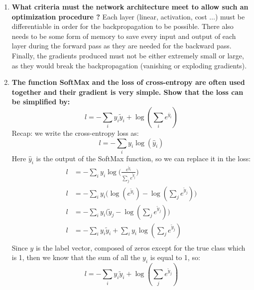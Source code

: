 \documentclass[12pt,a4paper]{article}
\begin{document}
\begin{enumerate}[resume]
    \item \textbf{What criteria must the network architecture meet to allow such an optimization procedure ?} \newline
    Each layer (linear, activation, cost $\dots$) must be differentiable in order for the backpropagation to be possible.
    There also needs to be some form of memory to save every input and output of each layer during the forward pass as they are
    needed for the backward pass. Finally, the gradients produced must not be either extremely small or large, as they would break 
    the backpropagation (vanishing or exploding gradients).

    \item \textbf{The function SoftMax and the loss of cross-entropy are often used together and their gradient is very simple. Show that the loss can be simpliﬁed by:
    $$ l = - \sum_{i}y_i \tilde{y}_i + \log (\sum_{i} e^{\bar{y}_i}) $$} \newline
    Recap: we write the cross-entropy loss as:
    \[
    l = - \sum_{i} y_i \log(\hat{y}_i)
    \]
    Here $\hat{y}_i$ is the output of the SoftMax function, so we can replace it in the loss:
    \begin{align*}
    l &= - \sum_{i} y_i \log\Big(\frac{e^{\tilde{y}_i}}{\sum_{j} e^{\tilde{y}_j}}\Big) \\
    l &= - \sum_{i} y_i \Big(\log(e^{\tilde{y}_i}) - \log(\sum_{j} e^{\tilde{y}_j})\Big) \\
    l &= - \sum_{i} y_i \Big(\tilde{y}_j - \log(\sum_{j} e^{\tilde{y}_j})\Big) \\
    l &= - \sum_{i} y_i \tilde{y}_i + \sum_{i} y_i \log(\sum_{j} e^{\tilde{y}_j}) \\
    \end{align*}
    Since $y$ is the label vector, composed of zeros except for the true class which is 1, then we know that the sum of all the $y_i$ is equal to 1, so:
    \[
    l = - \sum_{i} y_i \tilde{y}_i + \log(\sum_{j} e^{\tilde{y}_j})
    \]


\end{enumerate}
\end{document}
